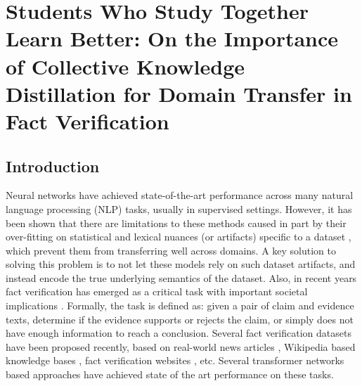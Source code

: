 \chapter{Students Who Study Together Learn Better: On the Importance of Collective Knowledge Distillation for Domain Transfer in Fact Verification \label{chapter:emnlp2021}}

\section{Introduction}
Neural networks have achieved state-of-the-art performance across many natural language processing (NLP) tasks, usually in supervised settings.
However, it has been shown that there are limitations to these %
methods caused in part by their over-fitting on statistical and lexical nuances (or artifacts) specific to a dataset \citep{gururangan-etal-2018-annotation}, which
prevent them from transferring well across domains. A key solution to solving this problem is to not let these models rely on such dataset artifacts, and instead encode the true underlying semantics of the dataset.
Also, in recent years fact verification has emerged as a critical task with important societal implications \citep{vosoughi2018spread}. Formally, the task is defined as: given a pair of claim and evidence texts, determine if the evidence supports or rejects the claim, or simply does not have enough information to reach a conclusion.
Several fact verification datasets have been proposed recently, based on real-world news articles \cite{pomerleau2017fake}, Wikipedia based knowledge bases \cite{thorne-etal-2018-fact}, fact verification websites \cite{wang2017liar}, etc. %
Several transformer networks \citep{vaswani2017attention} based approaches %
\cite{liu-etal-2020-microsoft} have achieved state of the art performance on these tasks.

